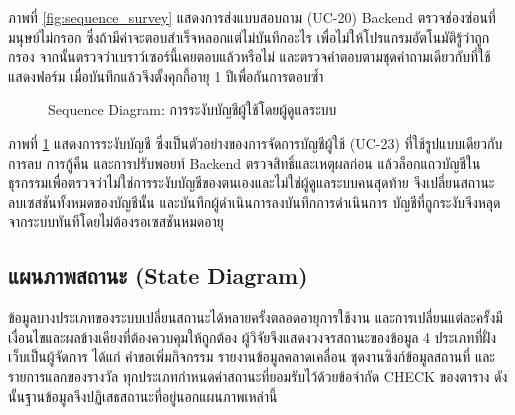 ภาพที่ \ref{fig:sequence_survey} แสดงการส่งแบบสอบถาม (UC-20) Backend ตรวจช่องซ่อนที่มนุษย์ไม่กรอก ซึ่งถ้ามีค่าจะตอบสำเร็จหลอกแต่ไม่บันทึกอะไร เพื่อไม่ให้โปรแกรมอัตโนมัติรู้ว่าถูกกรอง จากนั้นตรวจว่าเบราว์เซอร์นี้เคยตอบแล้วหรือไม่ และตรวจคำตอบตามชุดคำถามเดียวกับที่ใช้แสดงฟอร์ม เมื่อบันทึกแล้วจึงตั้งคุกกี้อายุ 1 ปีเพื่อกันการตอบซ้ำ

\begin{figure}[H]
\centering
{}
\caption{Sequence Diagram: การระงับบัญชีผู้ใช้โดยผู้ดูแลระบบ}
\label{fig:sequence_suspend}
\end{figure}

ภาพที่ \ref{fig:sequence_suspend} แสดงการระงับบัญชี ซึ่งเป็นตัวอย่างของการจัดการบัญชีผู้ใช้ (UC-23) ที่ใช้รูปแบบเดียวกับการลบ การกู้คืน และการปรับพอยท์ Backend ตรวจสิทธิ์และเหตุผลก่อน แล้วล็อกแถวบัญชีในธุรกรรมเพื่อตรวจว่าไม่ใช่การระงับบัญชีของตนเองและไม่ใช่ผู้ดูแลระบบคนสุดท้าย จึงเปลี่ยนสถานะ ลบเซสชันทั้งหมดของบัญชีนั้น และบันทึกผู้ดำเนินการลงบันทึกการดำเนินการ บัญชีที่ถูกระงับจึงหลุดจากระบบทันทีโดยไม่ต้องรอเซสชันหมดอายุ

\subsection{แผนภาพสถานะ (State Diagram)}

ข้อมูลบางประเภทของระบบเปลี่ยนสถานะได้หลายครั้งตลอดอายุการใช้งาน และการเปลี่ยนแต่ละครั้งมีเงื่อนไขและผลข้างเคียงที่ต้องควบคุมให้ถูกต้อง ผู้วิจัยจึงแสดงวงจรสถานะของข้อมูล 4 ประเภทที่ฝั่งเว็บเป็นผู้จัดการ ได้แก่ คำขอเพิ่มกิจกรรม รายงานข้อมูลคลาดเคลื่อน ชุดงานซิงก์ข้อมูลสถานที่ และรายการแลกของรางวัล ทุกประเภทกำหนดค่าสถานะที่ยอมรับไว้ด้วยข้อจำกัด CHECK ของตาราง ดังนั้นฐานข้อมูลจึงปฏิเสธสถานะที่อยู่นอกแผนภาพเหล่านี้

